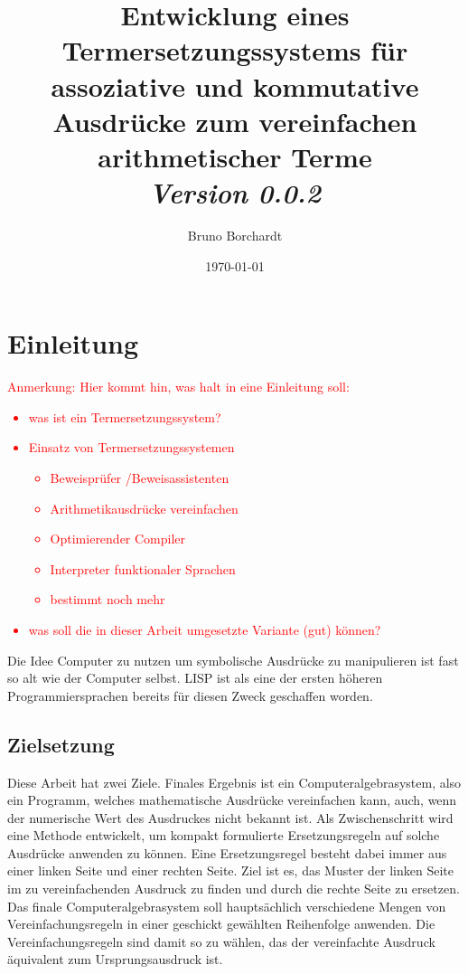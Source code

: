 \documentclass{scrartcl}
\title{Entwicklung eines Termersetzungssystems für assoziative und kommutative Ausdrücke zum vereinfachen arithmetischer Terme\\ \textit{Version 0.0.2}}
\author{Bruno Borchardt}
\date{\today}
\numberwithin{figure}{section} %
\theoremstyle{definition} %
\begin{document}
\maketitle

\tableofcontents

\clearpage

\section{Einleitung} \label{secEinleitung}
\textcolor{red} {
\begin{itshape}
Anmerkung: Hier kommt hin, was halt in eine Einleitung soll:
\begin{itemize}
    \item was ist ein Termersetzungssystem?
    \item Einsatz von Termersetzungssystemen
    \begin{itemize}
        \item Beweisprüfer /Beweisassistenten
        \item Arithmetikausdrücke vereinfachen
        \item Optimierender Compiler
	\item Interpreter funktionaler Sprachen
        \item bestimmt noch mehr
    \end{itemize}
    \item was soll die in dieser Arbeit umgesetzte Variante (gut) können?
\end{itemize}
\end{itshape}
}

Die Idee Computer zu nutzen um symbolische Ausdrücke zu manipulieren ist fast so alt wie der Computer selbst.  LISP \cite{lisp} ist als eine der ersten höheren Programmiersprachen bereits für diesen Zweck geschaffen worden. 

\subsection{Zielsetzung}
Diese Arbeit hat zwei Ziele. Finales Ergebnis ist ein Computeralgebrasystem, also ein Programm, welches mathematische Ausdrücke vereinfachen kann, auch, wenn der numerische Wert des Ausdruckes nicht bekannt ist. Als Zwischenschritt wird eine Methode entwickelt, um kompakt formulierte Ersetzungsregeln auf solche Ausdrücke anwenden zu können. Eine Ersetzungsregel besteht dabei immer aus einer linken Seite und einer rechten Seite. Ziel ist es, das Muster der linken Seite im zu vereinfachenden Ausdruck zu finden und durch die rechte Seite zu ersetzen. Das finale Computeralgebrasystem soll hauptsächlich verschiedene Mengen von Vereinfachungsregeln in einer geschickt gewählten Reihenfolge anwenden. Die Vereinfachungsregeln sind damit so zu wählen, das der vereinfachte Ausdruck äquivalent zum Ursprungsausdruck ist.
\end{document}
